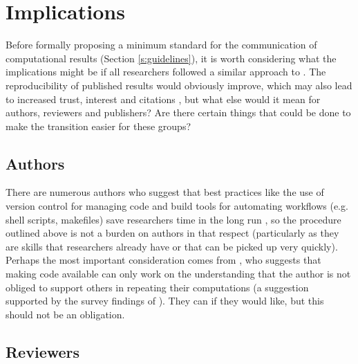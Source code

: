 \section{Implications}

Before formally proposing a minimum standard for the communication of computational results (Section \ref{s:guidelines}), it is worth considering what the implications might be if all researchers followed a similar approach to \citet{Irving2015}. The reproducibility of published results would obviously improve, which may also lead to increased trust, interest and citations \citep{Piwowar2007}, but what else would it mean for authors, reviewers and publishers? Are there certain things that could be done to make the transition easier for these groups?

\subsection{Authors}

There are numerous authors who suggest that best practices like the use of version control for managing code and build tools for automating workflows (e.g. shell scripts, makefiles) save researchers time in the long run \citep[e.g.][]{Sandve2013,Wilson2014a}, so the procedure outlined above is not a burden on authors in that respect (particularly as they are skills that researchers already have or that can be picked up very quickly). Perhaps the most important consideration comes from \citet{Easterbrook2014}, who suggests that making code available can only work on the understanding that the author is not obliged to support others in repeating their computations (a suggestion supported by the survey findings of \citet{Stodden2010}). They can if they would like, but this should not be an obligation.

\subsection{Reviewers}

